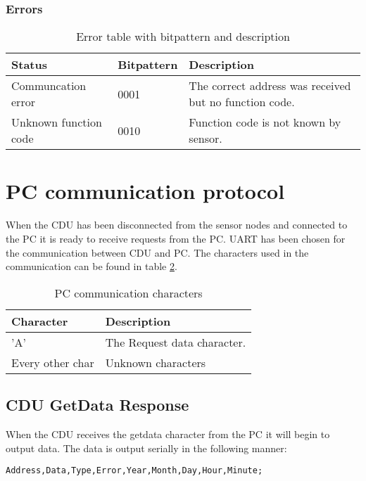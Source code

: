 \subsubsection{Errors}
\begin{table}[H]
\centering
\begin{tabular}{|l|l|l|}
	\hline
	Status & Bitpattern & Description \\ 
	\hline
	Communcation error 	& 0001  & The correct address was received but no function code. \\
	\hline
	Unknown function code  & 0010  & Function code is not known by sensor. \\
	\hline
\end{tabular}
\caption{Error table with bitpattern and description}
\label{table:errortable}
\end{table}

\section{PC communication protocol}
When the CDU has been disconnected from the sensor nodes and connected to the PC it is ready to receive requests from the PC. UART has been chosen for the communication between CDU and PC. The characters used in the communication can be found in table \ref{table:UARTtable}.
\begin{table}[H]
\centering
\begin{tabular}{|l|l|}
	\hline
	Character  & Description\\ 
	\hline
	'A' 	  & The Request data character. \\
	\hline
	Every other char & Unknown characters \\
	\hline
\end{tabular}
\caption{PC communication characters}
\label{table:UARTtable}
\end{table}

\subsection{CDU GetData Response}
When the CDU receives the getdata character from the PC it will begin to output data. The data is output serially in the following manner:
\begin{verbatim}
Address,Data,Type,Error,Year,Month,Day,Hour,Minute;
\end{verbatim}


